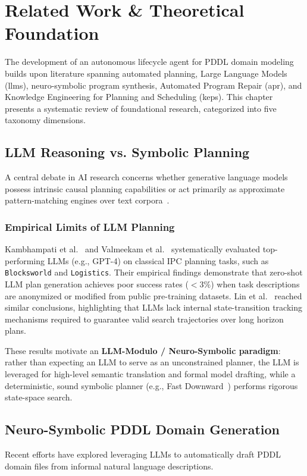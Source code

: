 \chapter{Related Work \& Theoretical Foundation}
\label{chap:related_work}

The development of an autonomous lifecycle agent for PDDL domain modeling builds upon literature spanning automated planning, Large Language Models (\gls{llm}s), neuro-symbolic program synthesis, Automated Program Repair (\gls{apr}), and Knowledge Engineering for Planning and Scheduling (\gls{keps}). This chapter presents a systematic review of foundational research, categorized into five taxonomy dimensions.

\section{LLM Reasoning vs. Symbolic Planning}
A central debate in AI research concerns whether generative language models possess intrinsic causal planning capabilities or act primarily as approximate pattern-matching engines over text corpora~\cite{kambhampati2024}.

\subsection{Empirical Limits of LLM Planning}
Kambhampati et al.~\cite{kambhampati2024} and Valmeekam et al.~\cite{valmeekam2023} systematically evaluated top-performing LLMs (e.g., GPT-4) on classical IPC planning tasks, such as \texttt{Blocksworld} and \texttt{Logistics}. Their empirical findings demonstrate that zero-shot LLM plan generation achieves poor success rates ($<3\%$) when task descriptions are anonymized or modified from public pre-training datasets. Lin et al.~\cite{lin2023} reached similar conclusions, highlighting that LLMs lack internal state-transition tracking mechanisms required to guarantee valid search trajectories over long horizon plans.

These results motivate an \textbf{LLM-Modulo / Neuro-Symbolic paradigm}: rather than expecting an LLM to serve as an unconstrained planner, the LLM is leveraged for high-level semantic translation and formal model drafting, while a deterministic, sound symbolic planner (e.g., Fast Downward~\cite{helmert2006}) performs rigorous state-space search.

\section{Neuro-Symbolic PDDL Domain Generation}
Recent efforts have explored leveraging LLMs to automatically draft PDDL domain files from informal natural language descriptions.

